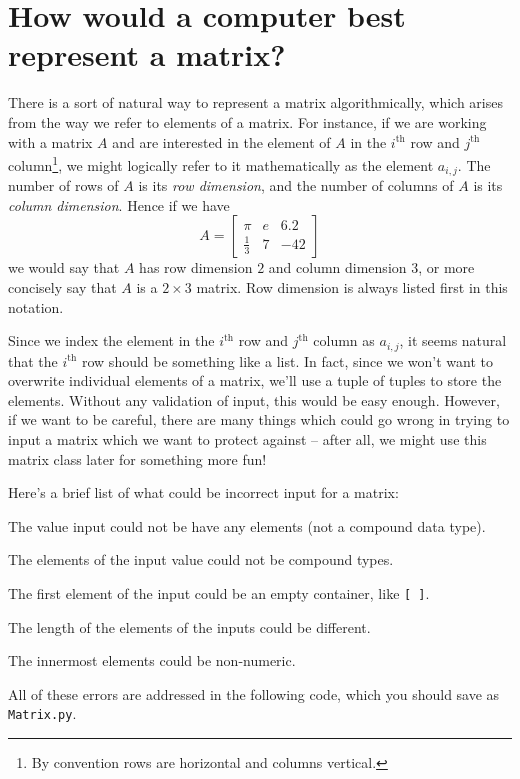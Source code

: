 \documentclass[m3380-lec-main.tex]{subfiles}
\begin{document}
\section{How would a computer best represent a matrix?}
There is a sort of natural way to represent a matrix algorithmically, which arises from the way we refer to elements of a matrix. For instance, if we are working with a matrix $A$ and are interested in the element of $A$ in the $i^\text{th}$ row and $j^\text{th}$ column\footnote{By convention rows are horizontal and columns vertical.}, we might logically refer to it mathematically as the element $a_{i,j}$. The number of rows of $A$ is its \emph{row dimension}, and the number of columns of $A$ is its \emph{column dimension}. Hence if we have 
\[A=\begin{bmatrix} \pi& e& 6.2 \\ \frac13 & 7 & -42\end{bmatrix}\]
we would say that $A$ has row dimension $2$ and column dimension $3$, or more concisely say that $A$ is a $2\times 3$ matrix. Row dimension is always listed first in this notation.

Since we index the element in the $i^\text{th}$ row and $j^\text{th}$ column as $a_{i,j}$, it seems natural that the $i^\text{th}$ row should be something like a list. In fact, since we won't want to overwrite individual elements of a matrix, we'll use a tuple of tuples to store the elements. Without any validation of input, this would be easy enough. However, if we want to be careful, there are many things which could go wrong in trying to input a matrix which we want to protect against -- after all, we might use this matrix class later for something more fun!

Here's a brief list of what could be incorrect input for a matrix:
\begin{enum}
\item The value input could not be have any elements (not a compound data type).
\item The elements of the input value could not be compound types.
\item The first element of the input could be an empty container, like \verb|[ ]|.
\item The length of the elements of the inputs could be different.
\item The innermost elements could be non-numeric.
\end{enum}
All of these errors are addressed in the following code, which you should save as \verb|Matrix.py|.
\end{document}
